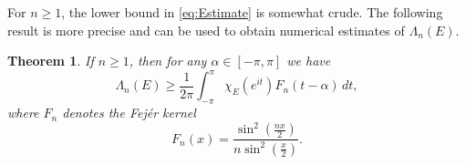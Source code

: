 \documentclass[11pt,reqno]{amsart}
\numberwithin{equation}{section}
\theoremstyle{plain}
\newtheorem{Theorem}[equation]{Theorem}
\theoremstyle{definition}
\begin{document}
	For $n  \geq 1$, the lower bound in \eqref{eq:Estimate} is somewhat crude.
	The following result is more precise and can be used to obtain numerical estimates of  $\Lambda_n(E)$.

			
	\begin{Theorem}\label{Theorem:Fejer}
		If $n \geq 1$, then for any $\alpha \in [-\pi,\pi]$ we have
		\begin{equation}\label{eq-Fejer}
			\Lambda_{n}(E) \geq \frac{1}{2\pi}\int_{-\pi}^{\pi} \chi_E(e^{it}) F_n(t-\alpha)\,dt,
		\end{equation}
		where $F_n$ denotes the Fej\'er kernel
		\begin{equation*}
			F_n(x) = \frac{\sin^2 (\frac{nx}{2})}{n\sin^2 (\frac{x}{2})}.
		\end{equation*}
		
	\end{Theorem}	
\end{document}
